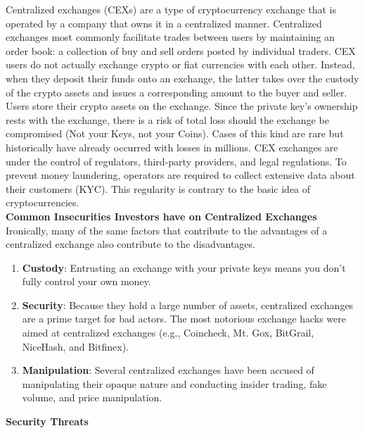 \documentclass[10pt]{article}
\begin{document}
Centralized exchanges (CEXs) are a type of cryptocurrency exchange that is operated by a company that owns it in a centralized manner. Centralized exchanges most commonly facilitate trades between users by maintaining an order book: a collection of buy and sell orders posted by individual traders. CEX users do not actually exchange crypto or fiat currencies with each other. Instead, when they deposit their funds onto an exchange, the latter takes over the custody of the crypto assets and issues a corresponding amount to the buyer and seller. Users store their crypto assets on the exchange. Since the private key's ownership rests with the exchange, there is a risk of total loss should the exchange be compromised (Not your Keys, not your Coins). Cases of this kind are rare but historically have already occurred with losses in millions. CEX exchanges are under the control of regulators, third-party providers, and legal regulations. To prevent money laundering, operators are required to collect extensive data about their customers (KYC). This regularity is contrary to the basic idea of cryptocurrencies.\\

\textbf{Common Insecurities Investors have on Centralized Exchanges}\\

Ironically, many of the same factors that contribute to the advantages of a centralized exchange also contribute to the disadvantages.
\begin{enumerate}[leftmargin=+0.2in]
\item \textbf{Custody}: Entrusting an exchange with your private keys means you don’t fully control your own money.

\item \textbf{Security}: Because they hold a large number of assets, centralized exchanges are a prime target for bad actors. The most notorious exchange hacks were aimed at centralized exchanges (e.g., Coincheck, Mt. Gox, BitGrail, NiceHash, and Bitfinex).

\item \textbf{Manipulation}: Several centralized exchanges have been accused of manipulating their opaque nature and conducting insider trading, fake volume, and price manipulation.
\end{enumerate}

\textbf{Security Threats}\\
\end{document}
